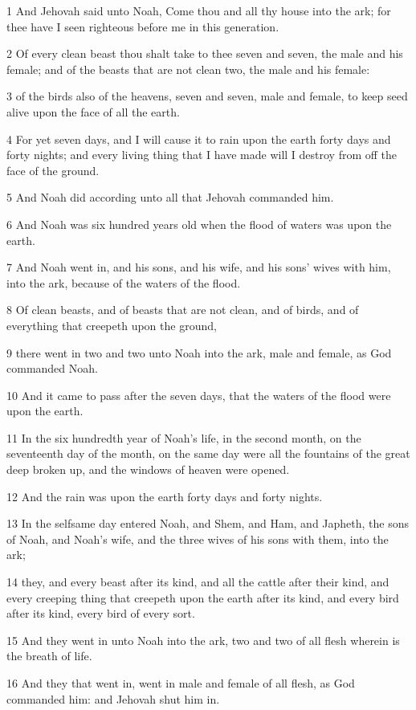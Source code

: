 \par 1 And Jehovah said unto Noah, Come thou and all thy house into the ark; for thee have I seen righteous before me in this generation.
\par 2 Of every clean beast thou shalt take to thee seven and seven, the male and his female; and of the beasts that are not clean two, the male and his female:
\par 3 of the birds also of the heavens, seven and seven, male and female, to keep seed alive upon the face of all the earth.
\par 4 For yet seven days, and I will cause it to rain upon the earth forty days and forty nights; and every living thing that I have made will I destroy from off the face of the ground.
\par 5 And Noah did according unto all that Jehovah commanded him.
\par 6 And Noah was six hundred years old when the flood of waters was upon the earth.
\par 7 And Noah went in, and his sons, and his wife, and his sons' wives with him, into the ark, because of the waters of the flood.
\par 8 Of clean beasts, and of beasts that are not clean, and of birds, and of everything that creepeth upon the ground,
\par 9 there went in two and two unto Noah into the ark, male and female, as God commanded Noah.
\par 10 And it came to pass after the seven days, that the waters of the flood were upon the earth.
\par 11 In the six hundredth year of Noah's life, in the second month, on the seventeenth day of the month, on the same day were all the fountains of the great deep broken up, and the windows of heaven were opened.
\par 12 And the rain was upon the earth forty days and forty nights.
\par 13 In the selfsame day entered Noah, and Shem, and Ham, and Japheth, the sons of Noah, and Noah's wife, and the three wives of his sons with them, into the ark;
\par 14 they, and every beast after its kind, and all the cattle after their kind, and every creeping thing that creepeth upon the earth after its kind, and every bird after its kind, every bird of every sort.
\par 15 And they went in unto Noah into the ark, two and two of all flesh wherein is the breath of life.
\par 16 And they that went in, went in male and female of all flesh, as God commanded him: and Jehovah shut him in.
